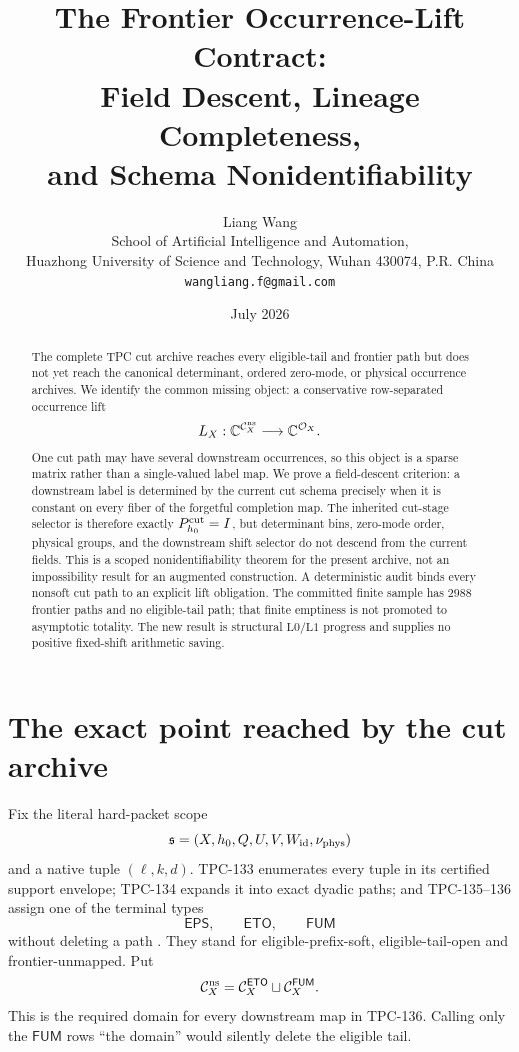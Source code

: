 \documentclass[11pt]{article}
\title{\textbf{The Frontier Occurrence-Lift Contract:}\\
\textbf{Field Descent, Lineage Completeness,}\\
\textbf{and Schema Nonidentifiability}}
\author{Liang Wang\\
School of Artificial Intelligence and Automation,\\
Huazhong University of Science and Technology, Wuhan 430074, P.R. China\\
\texttt{wangliang.f@gmail.com}}
\date{July 2026}
\theoremstyle{definition}
\theoremstyle{remark}
\newcommand{\Ccut}{\mathcal C_X^{\rm ns}}
\begin{document}
\maketitle

\begin{abstract}
The complete TPC cut archive reaches every eligible-tail and frontier
path but does not yet reach the canonical determinant, ordered
zero-mode, or physical occurrence archives.  We identify the common
missing object: a conservative row-separated occurrence lift
\[
 L_X:\mathbb C^{\mathcal C_X^{\rm ns}}\longrightarrow
 \mathbb C^{\mathcal O_X}.
\]
One cut path may have several downstream occurrences, so this object
is a sparse matrix rather than a single-valued label map.  We prove a
field-descent criterion: a downstream label is determined by the
current cut schema precisely when it is constant on every fiber of
the forgetful completion map.  The inherited cut-stage selector is
therefore exactly \(P_{h_0}^{\rm cut}=I\), but determinant bins,
zero-mode order, physical groups, and the downstream shift selector
do not descend from the current fields.  This is a scoped
nonidentifiability theorem for the present archive, not an
impossibility result for an augmented construction.  A deterministic
audit binds every nonsoft cut path to an explicit lift obligation.
The committed finite sample has \(2988\) frontier paths and no
eligible-tail path; that finite emptiness is not promoted to
asymptotic totality.  The new result is structural
\(\mathrm{L0}/\mathrm{L1}\) progress and supplies no positive
fixed-shift arithmetic saving.
\end{abstract}

\section{The exact point reached by the cut archive}

Fix the literal hard-packet scope
\[
 \mathfrak s=(X,h_0,Q,U,V,W_{\rm id},\nu_{\rm phys})
\]
and a native tuple \((\ell,k,d)\).  TPC-133 enumerates every tuple in
its certified support envelope; TPC-134 expands it into exact dyadic
paths; and TPC-135--136 assign one of the terminal types
\[
 \mathsf{EPS},\qquad \mathsf{ETO},\qquad \mathsf{FUM}
\]
without deleting a path \citep{WangTPC133,WangTPC134,WangTPC135,WangTPC136}.
They stand for eligible-prefix-soft, eligible-tail-open and
frontier-unmapped.  Put
\[
 \Ccut=\mathcal C_X^{\mathsf{ETO}}\sqcup
       \mathcal C_X^{\mathsf{FUM}}.
\]
This is the required domain for every downstream map in TPC-136.
Calling only the \(\mathsf{FUM}\) rows ``the domain'' would silently
delete the eligible tail.
\end{document}
